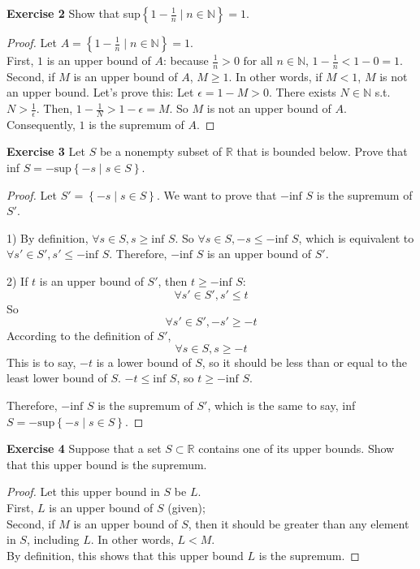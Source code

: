 \documentclass[12pt]{article}
\newcommand{\bbN}{\mathbb{N}}
\newcommand{\bbR}{\mathbb{R}}
\theoremstyle{definition}
\numberwithin{equation}{subsection}
\begin{document}
\textbf{Exercise 2} Show that sup$\left\{1-\frac{1}{n}
\mid n \in \mathbb{N}\right\}=1$.
\begin{proof}
Let $A = \left\{1-\frac{1}{n}
\mid n \in \mathbb{N}\right\}=1$.\\
First, $1$ is an upper bound of $A$: because $\frac{1}{n} > 0 \text{ for all }
n \in \bbN$, $1-\frac{1}{n} < 1-0=1$. \\
Second, if $M$ is an upper bound of $A$, $M \geq 1$. In other words, if $M < 1$, $M$ is not an upper bound. Let's prove this: Let $\epsilon = 1 - M > 0$. There exists $N \in \bbN$ s.t. $N > \frac{1}{\epsilon}$. Then, $1-\frac{1}{N} > 1-\epsilon = M$. So $M$ is not an upper bound of $A$.\\
Consequently, $1$ is the supremum of $A$.
\end{proof}

\textbf{Exercise 3} Let $S$ be a nonempty subset of $\bbR$ that is bounded below. Prove that
\\inf $S=-\text{sup}\left\{-s \mid s \in S \right\}$.
\newcommand{\infS}{\text{inf } S}
\newcommand{\supS}{\text{sup } S'}
\begin{proof}
Let $S' = \left\{-s \mid s \in S \right\}$. We want to prove that $-\infS$ is the supremum of $S'$.

1) By definition, $\forall s \in S, s \geq \infS$. So $\forall s \in S, -s \leq -\infS$, which is equivalent to $\forall s' \in S', s' \leq -\infS$. Therefore, $-\infS$ is an upper bound of $S'$.

2) If $t$ is an upper bound of $S'$, then $t \geq -\infS$:
$$
\forall s' \in S', s' \leq t
$$
So
$$
\forall s' \in S', -s' \geq -t
$$
According to the definition of $S'$,
$$
\forall s \in S, s \geq -t
$$
This is to say, $-t$ is a lower bound of $S$, so it should be less than or equal to the least lower bound of $S$. $-t\leq \infS$, so $t \geq -\infS$.

Therefore, $-\infS$ is the supremum of $S'$, which is the same to say, inf $S=-\text{sup}\left\{-s \mid s \in S \right\}$.
\end{proof}

\textbf{Exercise 4} Suppose that a set $S \subset \bbR$ contains one of
 its upper bounds. Show that this upper bound is the supremum.
\begin{proof}
Let this upper bound in $S$ be $L$.\\
First, $L$ is an upper bound of $S$ (given);\\
Second, if $M$ is an upper bound of $S$, then it should be greater than any
element in $S$, including $L$. In other words, $L < M$.\\
By definition, this shows that this upper bound $L$ is the supremum.
\end{proof}
\end{document}
